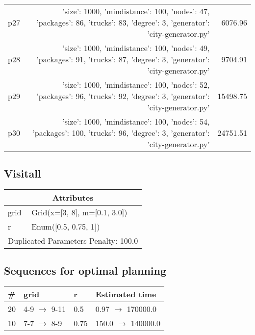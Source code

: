 \documentclass{article}
\begin{document}
\begin{center}
\begin{tabular}{@{}l|r|r@{}}
  p27&{'size': 1000, 'mindistance': 100, 'nodes': 47, 'packages': 86, 'trucks': 83, 'degree': 3, 'generator': 'city-generator.py'}&6076.96\\
  p28&{'size': 1000, 'mindistance': 100, 'nodes': 49, 'packages': 91, 'trucks': 87, 'degree': 3, 'generator': 'city-generator.py'}&9704.91\\
  p29&{'size': 1000, 'mindistance': 100, 'nodes': 52, 'packages': 96, 'trucks': 92, 'degree': 3, 'generator': 'city-generator.py'}&15498.75\\
  p30&{'size': 1000, 'mindistance': 100, 'nodes': 54, 'packages': 100, 'trucks': 96, 'degree': 3, 'generator': 'city-generator.py'}&24751.51
                            \end{tabular}
                            \end{center}
                    
                            \newpage \subsection{Visitall}
                    \begin{center}
                    \begin{tabular}{@{}p{}p{}@{}}
                    \multicolumn{2}{c}{\bf \large Attributes}\\\midrule
                    grid & Grid(x=[3, 8], m=[0.1, 3.0])\\
r & Enum([0.5, 0.75, 1]) \\\midrule
                    \multicolumn{2}{l}{Duplicated Parameters Penalty: 100.0}
                    \end{tabular}
                    \end{center}
                
                            \subsection*{Sequences for optimal planning}

                            \begin{center}
                            \begin{tabular}{@{}l|l|l|l@{}}
                            \# & grid & r & Estimated time\\\midrule
                            20&4-9 $\rightarrow$ 9-11&0.5&0.97 $\rightarrow$ 170000.0\\
10&7-7 $\rightarrow$ 8-9&0.75&150.0 $\rightarrow$ 140000.0
                            \end{tabular}
                            \end{center}
                    
\end{document}
